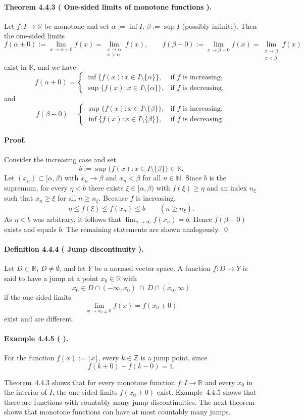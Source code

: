 \documentclass[12pt]{article}
\newcommand{\N}{\mathbb{N}}
\newcommand{\Z}{\mathbb{Z}}
\newcommand{\R}{\mathbb{R}}
\newcommand{\NumberedDefinition}[3]{%
\paragraph*{Definition #1 ( #2 ).} #3\par}
\newcommand{\NumberedTheorem}[3]{%
\paragraph*{Theorem #1 ( #2 ).} #3\par}
\newcommand{\NumberedExample}[3]{%
\paragraph*{Example #1 ( #2 ).} #3\par}
\begin{document}
\NumberedTheorem{4.4.3}{One-sided limits of monotone functions}{Let $f:I\to\R$ be monotone and set $\alpha:=\inf I$, $\beta:=\sup I$ (possibly infinite). Then the one-sided limits
\[
	f(\alpha+0):=\lim_{x\to\alpha+0} f(x)=\lim_{\substack{x\to\alpha\\ x>\alpha}} f(x),
	\qquad
	f(\beta-0):=\lim_{x\to\beta-0} f(x)=\lim_{\substack{x\to\beta\\ x<\beta}} f(x)
\]
exist in $\R$, and we have
\[
	f(\alpha+0)=
	\begin{cases}
		\inf\{f(x): x\in I\setminus\{\alpha\}\}, & \text{if $f$ is increasing},\\[0.3em]
		\sup\{f(x): x\in I\setminus\{\alpha\}\}, & \text{if $f$ is decreasing},
	\end{cases}
\]
and
\[
	f(\beta-0)=
	\begin{cases}
		\sup\{f(x): x\in I\setminus\{\beta\}\}, & \text{if $f$ is increasing},\\[0.3em]
		\inf\{f(x): x\in I\setminus\{\beta\}\}, & \text{if $f$ is decreasing}.
	\end{cases}
\]
}
\paragraph{Proof.} Consider the increasing case and set
\[
	b:=\sup\{f(x): x\in I\setminus\{\beta\}\}\in\overline{\R}.
\]
Let $(x_n)\subset [\alpha,\beta)$ with $x_n\to\beta$ and $x_n<\beta$ for all $n\in\N$. Since $b$ is the supremum, for every $\eta<b$ there exists $\xi\in[\alpha,\beta)$ with $f(\xi)\ge\eta$ and an index $n_{\xi}$ such that $x_n\ge\xi$ for all $n\ge n_{\xi}$. Because $f$ is increasing,
\[
	\eta\le f(\xi)\le f(x_n)\le b \qquad (n\ge n_{\xi}).
\]
As $\eta<b$ was arbitrary, it follows that $\lim_{n\to\infty} f(x_n)=b$. Hence $f(\beta-0)$ exists and equals $b$. The remaining statements are shown analogously. \qed

\NumberedDefinition{4.4.4}{Jump discontinuity}{Let $D\subset\R$, $D\ne\emptyset$, and let $Y$ be a normed vector space. A function $f:D\to Y$ is said to have a jump at a point $x_0\in\R$ with
\[
	x_0\in \overline{D\cap(-\infty,x_0)}\ \cap\ \overline{D\cap(x_0,\infty)}
\]
if the one-sided limits
\[
	\lim_{x\to x_0\pm 0} f(x) = f(x_0\pm 0)
\]
exist and are different.}

\NumberedExample{4.4.5}{}{For the function $f(x):=\lfloor x\rfloor$, every $k\in\Z$ is a jump point, since
\[
	f(k+0)-f(k-0)=1.
\]
}

Theorem~4.4.3 shows that for every monotone function $f:I\to\R$ and every $x_0$ in the interior of $I$, the one-sided limits $f(x_0\pm 0)$ exist. Example~4.4.5 shows that there are functions with countably many jump discontinuities. The next theorem shows that monotone functions can have at most countably many jumps.
\end{document}
